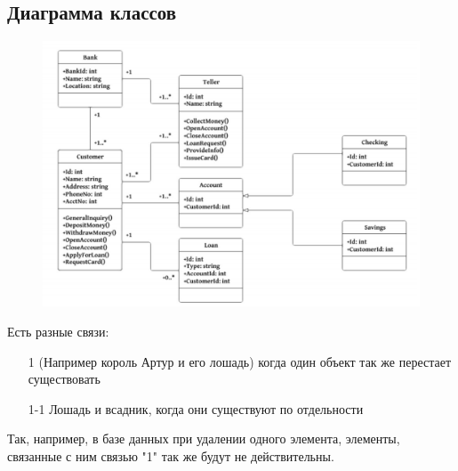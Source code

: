 \documentclass[12pt; a4paper]{book}
\theoremstyle{plain} %
\theoremstyle{defenition}
\theoremstyle{remark}
\begin{document}
\subsection{Диаграмма классов}
\begin{figure}[!hbp]
\includegraphics[angle=0, width=\textwidth]{IMG/2} \\
\end{figure}
Есть разные связи: 
\begin{enumerate}
\item[1] (Например король Артур и его лошадь) когда один объект так же перестает существовать
\item[1-1] Лошадь и всадник, когда они существуют по отдельности
\end{enumerate}
Так, например, в базе данных при удалении одного элемента, элементы, связанные с ним связью "1" так же будут не действительны.
\newpage
\end{document}
